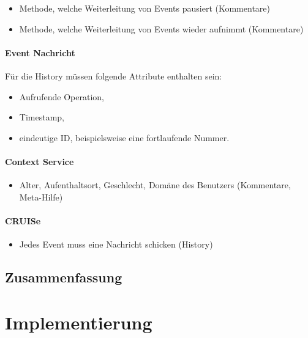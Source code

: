\documentclass[
	headsepline,
	footsepline,
	fontsize=12pt,
	bibliography=totoc
]{scrbook}
\begin{document}
\begin{itemize}
	\item Methode, welche Weiterleitung von Events pausiert (Kommentare)
	\item Methode, welche Weiterleitung von Events wieder aufnimmt (Kommentare)
\end{itemize}

\subsubsection{Event Nachricht}

Für die History müssen folgende Attribute enthalten sein:

\begin{itemize}
	\item Aufrufende Operation,
	\item Timestamp,
	\item eindeutige ID, beispielsweise eine fortlaufende Nummer.
\end{itemize}

\subsubsection{Context Service}

\begin{itemize}
	\item Alter, Aufenthaltsort, Geschlecht, Domäne des Benutzers (Kommentare, Meta-Hilfe)
\end{itemize}

\subsubsection{CRUISe}

\begin{itemize}
	\item Jedes Event muss eine Nachricht schicken (History)
\end{itemize}

\section{Zusammenfassung}
\label{section:konzeption:zusammenfassung}

\chapter{Implementierung}
\label{chapter:implementierung}

\printbibliography[title=Literaturverzeichnis]

\end{document}
